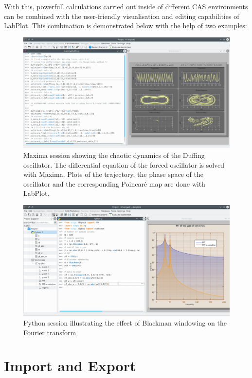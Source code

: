 With this, powerfull calculations carried out inside of different CAS environments can be combined with the user-friendly visualisation and editing capabilities of LabPlot. This combination is demonstrated below with the help of two examples:
\begin{figure}
\includegraphics[width=\textwidth]{images/maxima_session.png}
\caption{Maxima session showing the chaotic dynamics of the Duffing oscillator. The differential equation of the forced oscillator is solved with Maxima. Plots of the trajectory, the phase space of the oscillator and the corresponding Poincaré map are done with LabPlot.}
\end{figure}

\begin{figure}
\includegraphics[width=\textwidth]{images/python_session.png}
\caption{Python session illustrating the effect of Blackman windowing on the Fourier transform}
\end{figure}



\chapter{Import and Export}
